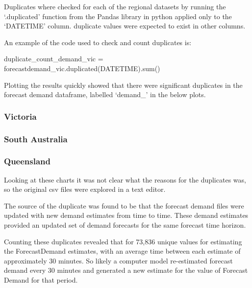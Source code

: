 \documentclass[
]{article}
\newenvironment{Shaded}{}{}
\newcommand{\BuiltInTok}[1]{\textcolor[rgb]{0.00,0.50,0.00}{#1}}
\newcommand{\NormalTok}[1]{#1}
\newcommand{\OperatorTok}[1]{\textcolor[rgb]{0.40,0.40,0.40}{#1}}
\newcommand{\StringTok}[1]{\textcolor[rgb]{0.25,0.44,0.63}{#1}}
\begin{document}
Duplicates where checked for each of the regional datasets by running
the `.duplicated' function from the Pandas library in python applied
only to the `DATETIME' column. duplicate values were expected to exist
in other columns.

An example of the code used to check and count duplicates is:

\begin{Shaded}
\begin{Highlighting}[]
\NormalTok{duplicate\_count\_demand\_vic }\OperatorTok{=}\NormalTok{ forecastdemand\_vic.duplicated(}\StringTok{\textquotesingle{}DATETIME\textquotesingle{}}\NormalTok{).}\BuiltInTok{sum}\NormalTok{()}
\end{Highlighting}
\end{Shaded}

Plotting the results quickly showed that there were significant
duplicates in the forecast demand dataframe, labelled `demand\_' in the
below plots.

\subsubsection{Victoria}\label{victoria}

\subsubsection{South Australia}\label{south-australia}

\subsubsection{Queensland}\label{queensland}

Looking at these charts it was not clear what the reasons for the
duplicates was, so the original csv files were explored in a text
editor.

The source of the duplicate was found to be that the forecast demand
files were updated with new demand estimates from time to time. These
demand estimates provided an updated set of demand forecasts for the
same forecast time horizon.

Counting these duplicates revealed that for 73,836 unique values for
estimating the ForecastDemand estimates, with an average time between
each estimate of approximately 30 minutes. So likely a computer model
re-estimated forecast demand every 30 minutes and generated a new
estimate for the value of Forecast Demand for that period.
\end{document}
